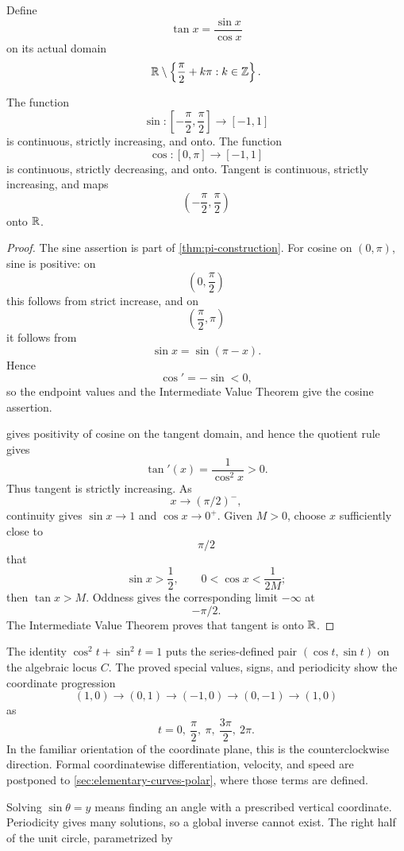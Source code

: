 \begin{definition}[Tangent]
Define
\[
\tan x=\frac{\sin x}{\cos x}
\]
on its actual domain
\[
\mathbb{R}\setminus\left\{\frac{\pi}{2}+k\pi:k\in\mathbb{Z}\right\}.
\]
\end{definition}

\begin{theorem}
\label{thm:trigonometric-restrictions}
The function
\[
\sin:\left[-\frac{\pi}{2},\frac{\pi}{2}\right]\to[-1,1]
\]
is continuous, strictly increasing, and onto. The function
\[
\cos:[0,\pi]\to[-1,1]
\]
is continuous, strictly decreasing, and onto. Tangent is continuous, strictly increasing, and maps
\[
\left(-\frac{\pi}{2},\frac{\pi}{2}\right)
\]
onto $\mathbb{R}$.
\end{theorem}
\begin{proof}
The sine assertion is part of \cref{thm:pi-construction}. For cosine on $(0,\pi)$, sine is positive: on
\[
\left(0,\frac{\pi}{2}\right)
\]
this follows from strict increase, and on
\[
\left(\frac{\pi}{2},\pi\right)
\]
it follows from
\[
\sin x=\sin(\pi-x).
\]
Hence
\[
\cos'=-\sin<0,
\]
so the endpoint values and the Intermediate Value Theorem give the cosine assertion.

 gives positivity of cosine on the tangent domain, and hence the quotient rule gives
\[
\tan'(x)=\frac1{\cos^2x}>0.
\]
Thus tangent is strictly increasing. As
\[
x\to(\pi/2)^-,
\]
 continuity gives $\sin x\to1$ and $\cos x\to0^+$. Given $M>0$, choose $x$ sufficiently close to
\[
\pi/2
\]
 that
\[
\sin x>\frac12,\qquad0<\cos x<\frac{1}{2M};
\]
then $\tan x>M$. Oddness gives the corresponding limit $-\infty$ at
\[
-\pi/2.
\]
 The Intermediate Value Theorem proves that tangent is onto $\mathbb{R}$.
\end{proof}

The identity $\cos^2t+\sin^2t=1$ puts the series-defined pair
$(\cos t,\sin t)$ on the algebraic locus $C$. The proved special values,
signs, and periodicity show the coordinate progression
\[
(1,0)\to(0,1)\to(-1,0)\to(0,-1)\to(1,0)
\]
as
\[
t=0,\ \frac\pi2,\ \pi,\ \frac{3\pi}{2},\ 2\pi.
\]
In the familiar orientation of the coordinate plane, this is the
counterclockwise direction. Formal coordinatewise differentiation, velocity,
and speed are postponed to \cref{sec:elementary-curves-polar}, where those
terms are defined.

Solving $\sin\theta=y$ means finding an angle with a prescribed vertical
coordinate. Periodicity gives many solutions, so a global inverse cannot
exist. The right half of the unit circle, parametrized by

